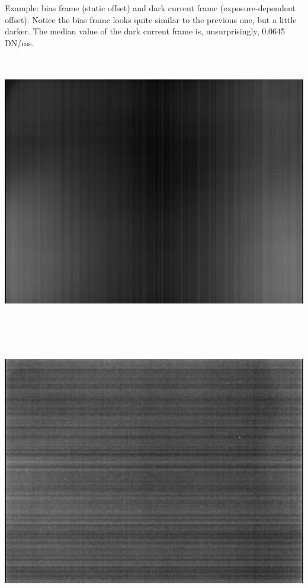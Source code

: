 Example: bias frame (static offset) and dark current frame (exposure-dependent offset). Notice the bias frame looks quite similar to the previous one, but a little darker. The median value of the dark current frame is, unsurprisingly, 0.0645 DN/ms. 

\begin{center}
\includegraphics[height=12cm]{images/darkframe-x1-no-blackcol-darkcurrent-256}
\end{center}

\begin{center}
\includegraphics[height=12cm]{images/dcnuframe-x1-no-blackcol-darkcurrent-256}
\end{center}

